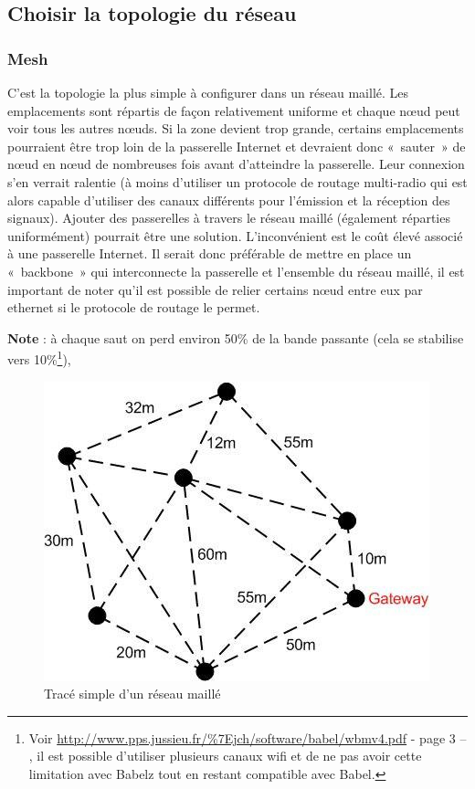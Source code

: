 \documentclass[a4paper,french,11pt,twoside]{article}
\begin{document}
\subsection{\label{choisir_topologie}Choisir la topologie du réseau}
\subsubsection{Mesh}

C'est la topologie la plus simple à configurer dans un réseau maillé. Les emplacements sont répartis de façon relativement uniforme et chaque nœud peut voir tous les autres nœuds. Si la zone devient trop grande, certains emplacements pourraient être trop loin de la passerelle Internet et devraient donc «~sauter~» de nœud en nœud de nombreuses fois avant d'atteindre la passerelle. Leur connexion s'en verrait ralentie (à moins d'utiliser un protocole de routage multi-radio qui est alors capable d'utiliser des canaux différents pour l'émission et la réception des signaux). Ajouter des passerelles à travers le réseau maillé (également réparties uniformément) pourrait être une solution. L'inconvénient est le coût élevé associé à une passerelle Internet. Il serait donc préférable de mettre en place un «~backbone~» qui interconnecte la passerelle et l'ensemble du réseau maillé, il est important de noter qu'il est possible de relier certains nœud entre eux par ethernet si le protocole de routage le permet.

\medskip
\noindent \textbf{Note} : à chaque saut on perd environ 50\% de la bande passante (cela se stabilise vers 10\%\footnote{Voir \url{http://www.pps.jussieu.fr/\%7Ejch/software/babel/wbmv4.pdf} - page 3 -- , il est possible d'utiliser plusieurs canaux wifi et de ne pas avoir cette limitation avec Babelz tout en restant compatible avec Babel.}), 
 
\begin{figure}[!h]
\center
\includegraphics[scale=0.50]{figure2.jpeg}
\caption{Tracé simple d'un réseau maillé} %
\label{figure2}
\end{figure}
\end{document}
